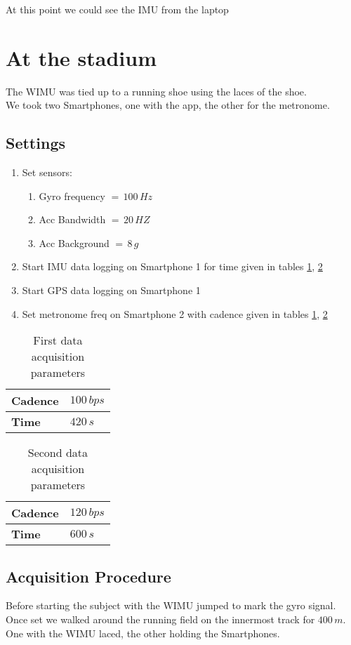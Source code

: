 \documentclass[a4paper,twoside,10pt]{report}
\begin{document}
At this point we could see the IMU from the laptop 
 

\section{At the stadium}
The WIMU was tied up to a running shoe using the laces of the shoe. \\
We took two Smartphones, one with the app, the other for the metronome. \\

\subsection{Settings} 
\begin{enumerate}
	\item Set sensors: 
		\begin{enumerate}
			\item Gyro frequency  $=\, 100\,Hz$
			\item Acc Bandwidth  $=\, 20\, HZ$
			\item Acc Background $=\, 8\,g$
		\end{enumerate}
	\item Start IMU data logging on Smartphone 1 for time given in tables \ref{tab:FirstDataAcquisitionParameters}, \ref{tab:SecondDataAcquisitionParameters}
	\item Start GPS data logging on Smartphone 1
	\item Set metronome freq on Smartphone 2 with cadence given in tables \ref{tab:FirstDataAcquisitionParameters}, \ref{tab:SecondDataAcquisitionParameters}
\end{enumerate}

\begin{table}[h]
	\centering
		\begin{tabular}{|l|l|}
		  \hline
			\textbf{Cadence} & $100\,bps$\\
			\hline
			\textbf{Time} & $420\,s$\\
			\hline
		\end{tabular}
	\caption{First data acquisition parameters}
	\label{tab:FirstDataAcquisitionParameters}
\end{table}

\begin{table}[h]
	\centering
		\begin{tabular}{|l|l|}
		  \hline
			\textbf{Cadence} & $120\,bps$\\
			\hline
			\textbf{Time} & $600\,s$\\
			\hline
		\end{tabular}
	\caption{Second data acquisition parameters}
	\label{tab:SecondDataAcquisitionParameters}
\end{table}

\subsection{Acquisition Procedure}
Before starting the subject with the WIMU jumped to mark the gyro signal. 
Once set we walked around the running field on the innermost track for $400\,m$. One with the WIMU laced, the other holding the Smartphones. 
\end{document}
